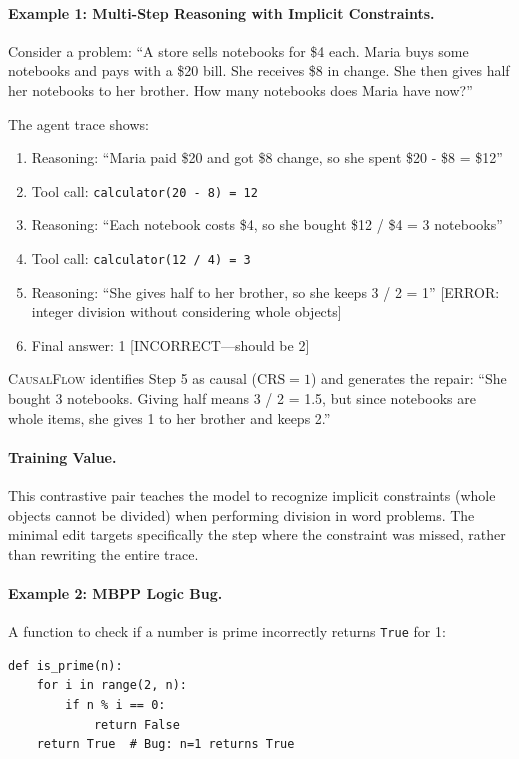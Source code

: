 \documentclass{article}
\theoremstyle{plain}
\theoremstyle{definition}
\theoremstyle{remark}
\begin{document}
\paragraph{Example 1: Multi-Step Reasoning with Implicit Constraints.}
Consider a problem: ``A store sells notebooks for \$4 each. Maria buys some notebooks and pays with a \$20 bill. She receives \$8 in change. She then gives half her notebooks to her brother. How many notebooks does Maria have now?''

The agent trace shows:
\begin{enumerate}
    \item Reasoning: ``Maria paid \$20 and got \$8 change, so she spent \$20 - \$8 = \$12''
    \item Tool call: \texttt{calculator(20 - 8) = 12}
    \item Reasoning: ``Each notebook costs \$4, so she bought \$12 / \$4 = 3 notebooks''
    \item Tool call: \texttt{calculator(12 / 4) = 3}
    \item Reasoning: ``She gives half to her brother, so she keeps 3 / 2 = 1'' [ERROR: integer division without considering whole objects]
    \item Final answer: 1 [INCORRECT---should be 2]
\end{enumerate}

\textsc{CausalFlow} identifies Step 5 as causal ($\text{CRS}=1$) and generates the repair: ``She bought 3 notebooks. Giving half means 3 / 2 = 1.5, but since notebooks are whole items, she gives 1 to her brother and keeps 2.''

\paragraph{Training Value.} This contrastive pair teaches the model to recognize implicit constraints (whole objects cannot be divided) when performing division in word problems. The minimal edit targets specifically the step where the constraint was missed, rather than rewriting the entire trace.

\paragraph{Example 2: MBPP Logic Bug.}
A function to check if a number is prime incorrectly returns \texttt{True} for 1:
\begin{verbatim}
def is_prime(n):
    for i in range(2, n):
        if n % i == 0:
            return False
    return True  # Bug: n=1 returns True
\end{verbatim}
\end{document}
